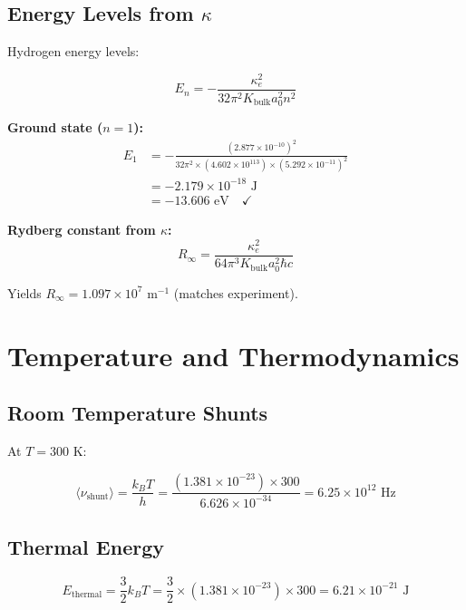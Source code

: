 \documentclass{article}
\begin{document}
\subsection{Energy Levels from $\kappa$}

Hydrogen energy levels:

\begin{equation}
E_n = -\frac{\kappa_e^2}{32 \pi^2 K_{\text{bulk}} a_0^2 n^2}
\end{equation}

\textbf{Ground state ($n=1$):}
\begin{align}
E_1 &= -\frac{(2.877 \times 10^{-10})^2}{32 \pi^2 \times (4.602 \times 10^{113}) \times (5.292 \times 10^{-11})^2} \\
&= -2.179 \times 10^{-18} \text{ J} \\
&= -13.606 \text{ eV} \quad \checkmark
\end{align}

\textbf{Rydberg constant from $\kappa$:}
\begin{equation}
R_\infty = \frac{\kappa_e^2}{64 \pi^3 K_{\text{bulk}} a_0^2 \hbar c}
\end{equation}

Yields $R_\infty = 1.097 \times 10^7$ m$^{-1}$ (matches experiment).

\section{Temperature and Thermodynamics}

\subsection{Room Temperature Shunts}

At $T = 300$ K:

\begin{equation}
\langle \nu_{\text{shunt}} \rangle = \frac{k_B T}{h} = \frac{(1.381 \times 10^{-23}) \times 300}{6.626 \times 10^{-34}} = 6.25 \times 10^{12} \text{ Hz}
\end{equation}

\subsection{Thermal Energy}

\begin{equation}
E_{\text{thermal}} = \frac{3}{2} k_B T = \frac{3}{2} \times (1.381 \times 10^{-23}) \times 300 = 6.21 \times 10^{-21} \text{ J}
\end{equation}
\end{document}
